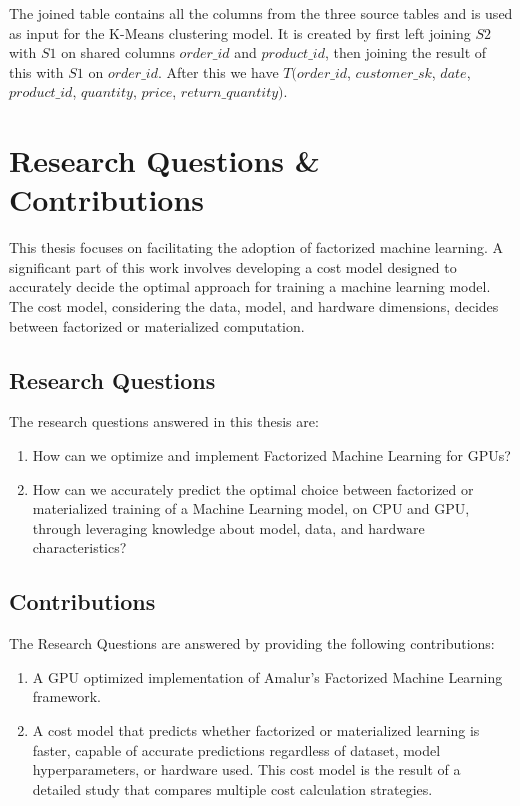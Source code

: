 The joined table contains all the columns from the three source tables and is used as input for the K-Means clustering model. It is created by first left joining $S2$ with $S1$ on shared columns $order\_id$ and $product\_id$, then joining the result of this with $S1$ on $order\_id$. After this we have $T(order\_id$, $customer\_sk$, $date$, $product\_id$, $quantity$, $price$, $return\_quantity)$.

\section{Research Questions \& Contributions}
This thesis focuses on facilitating the adoption of factorized machine learning. A significant part of this work involves developing a cost model designed to accurately decide the optimal approach for training a machine learning model. The cost model, considering the data, model, and hardware dimensions, decides between factorized or materialized computation.

\subsection{Research Questions}
The research questions answered in this thesis are:
\begin{enumerate}[leftmargin=1.5cm, label=\emph{RQ.\arabic*}]
  \item How can we optimize and implement Factorized Machine Learning for GPUs?
  \item How can we accurately predict the optimal choice between factorized or materialized training of a Machine Learning model, on CPU and GPU, through leveraging knowledge about model, data, and hardware characteristics?
\end{enumerate}

\subsection{Contributions}
The Research Questions are answered by providing the following contributions:
\begin{enumerate}[leftmargin=1.5cm, label=\emph{C.\arabic*}]
  \item A GPU optimized implementation of Amalur's Factorized Machine Learning framework.
  \item A cost model that predicts whether factorized or materialized learning is faster, capable of accurate predictions regardless of dataset, model hyperparameters, or hardware used. This cost model is the result of a detailed study that compares multiple cost calculation strategies.
\end{enumerate}

